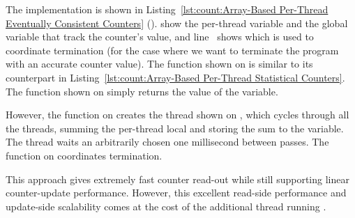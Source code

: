 \begin{fcvref}
The implementation is shown in
Listing~\ref{lst:count:Array-Based Per-Thread Eventually Consistent Counters}
().
show the per-thread variable and the global variable that
track the counter's value, and line~ shows 
which is used to coordinate termination (for the case where we want
to terminate the program with an accurate counter value).
The  function shown on
 is similar to its
counterpart in
Listing~\ref{lst:count:Array-Based Per-Thread Statistical Counters}.
The  function shown on
 simply returns the
value of the  variable.

However, the  function on
creates the  thread shown on
, which
cycles through all the threads,
summing the per-thread local  and storing the
sum to the  variable.
The  thread waits an arbitrarily chosen one millisecond
between passes.
The  function on
 coordinates termination.

This approach gives extremely fast counter read-out while still
supporting linear counter-update performance.
However, this excellent read-side performance and update-side scalability
comes at the cost of the additional thread running .
\end{fcvref}


